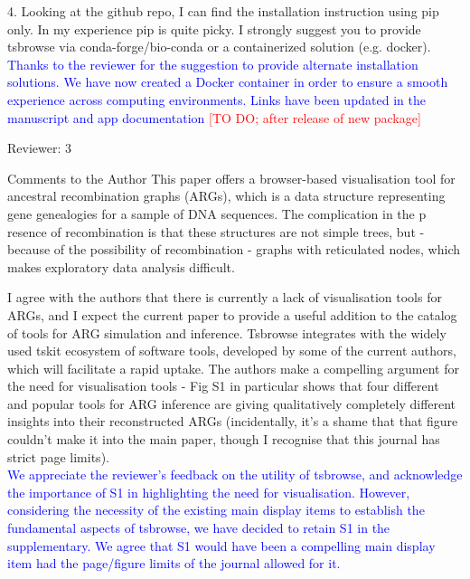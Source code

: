\documentclass{letter}
\begin{document}
\begin{letter}{}
4. Looking at the github repo, I can find the installation instruction using pip only. In my experience 
pip is quite picky. I strongly suggest you to provide tsbrowse via conda-forge/bio-conda or a containerized 
solution (e.g. docker).\\
\textcolor{blue}{Thanks to the reviewer for the suggestion to provide alternate installation solutions. 
We have now created a Docker container in order to ensure a smooth experience across computing environments. 
Links have been updated in the manuscript and app documentation}
\textcolor{red}{[TO DO; after release of new package]}

Reviewer: 3

Comments to the Author
This paper offers a browser-based visualisation tool for ancestral recombination graphs (ARGs), which is 
a data structure representing gene genealogies for a sample of DNA sequences. The complication in the p
resence of recombination is that these structures are not simple trees, but - because of the possibility 
of recombination - graphs with reticulated nodes, which makes exploratory data analysis difficult.

I agree with the authors that there is currently a lack of visualisation tools for ARGs, and I expect the 
current paper to provide a useful addition to the catalog of tools for ARG simulation and inference. Tsbrowse 
integrates with the widely used tskit ecosystem of software tools, developed by some of the current authors, 
which will facilitate a rapid uptake. The authors make a compelling argument for the need for visualisation 
tools - Fig S1 in particular shows that four different and popular tools for ARG inference are giving 
qualitatively completely different insights into their reconstructed ARGs (incidentally, it's a shame that 
that figure couldn't make it into the main paper, though I recognise that this journal has strict page limits).\\
\textcolor{blue}{We appreciate the reviewer's feedback on the utility of tsbrowse, and acknowledge the 
importance of S1 in highlighting the need for visualisation. However, considering the necessity of the 
existing main display items to establish the fundamental aspects of tsbrowse, we have decided to retain S1 
in the supplementary. We agree that S1 would have been a compelling main display item had the page/figure 
limits of the journal allowed for it.}


\end{letter}
\end{document}
